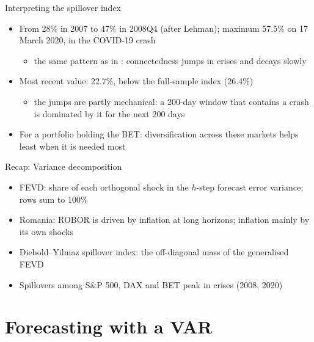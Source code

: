 \begin{frame}{Interpreting the spillover index}
\itemsize{\small}
\begin{itemize}
    \item From 28\% in 2007 to 47\% in 2008Q4 (after Lehman); maximum 57.5\% on 17 March 2020, in the COVID-19 crash
    \begin{itemize}
        \item the same pattern as in : connectedness jumps in crises and decays slowly
    \end{itemize}
    \item Most recent value: 22.7\%, below the full-sample index (26.4\%)
    \begin{itemize}
        \item the jumps are partly mechanical: a 200-day window that contains a crash is dominated by it for the next 200 days
    \end{itemize}
    \item For a portfolio holding the BET: diversification across these markets helps least when it is needed most
\end{itemize}
\end{frame}

\begin{frame}{Recap: Variance decomposition}
\itemsize{\small}
\begin{itemize}
    \item FEVD: share of each orthogonal shock in the $h$-step forecast error variance; rows sum to 100\%
    \item Romania: ROBOR is driven by inflation at long horizons; inflation mainly by its own shocks
    \item Diebold--Yilmaz spillover index: the off-diagonal mass of the generalised FEVD
    \item Spillovers among S\&P 500, DAX and BET peak in crises (2008, 2020)
\end{itemize}
\end{frame}


\section{Forecasting with a VAR}

